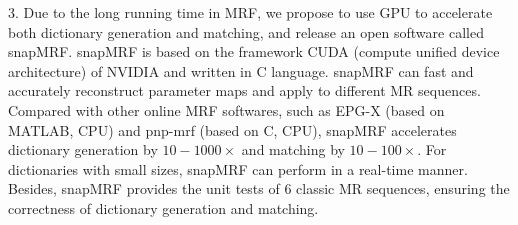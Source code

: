 \begin{englishabstract}
3. Due to the long running time in MRF, we propose to use GPU to accelerate both dictionary generation and matching, and release an open software called snapMRF. snapMRF is based on the framework CUDA (compute unified device architecture) of NVIDIA and written in C language. snapMRF can fast and accurately reconstruct parameter maps and apply to different MR sequences. Compared with other online MRF softwares, such as EPG-X (based on MATLAB, CPU) and pnp-mrf (based on C, CPU), snapMRF accelerates dictionary generation by $10-1000\times$ and matching by $10-100\times$. For dictionaries with small sizes, snapMRF can perform in a real-time manner. Besides, snapMRF provides the unit tests of 6 classic MR sequences, ensuring the correctness of dictionary generation and matching. 


\end{englishabstract}